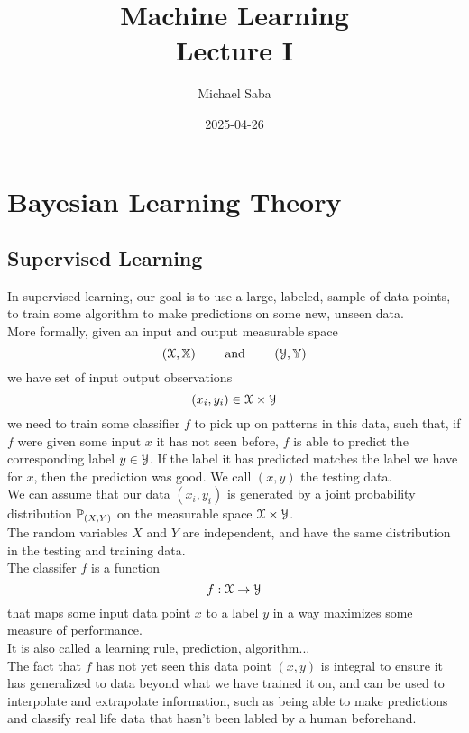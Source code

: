 \documentclass[12pt]{article}
\title{%
    \Huge Machine Learning \\
    \Large Lecture I
}
\date{2025-04-26}
\author{Michael Saba}
\begin{document}
\maketitle
\newpage
\setlength{\parindent}{0pt}

\section*{Bayesian Learning Theory}

\subsection*{Supervised Learning}

In supervised learning,
our goal is to use a large,
labeled, sample of data points,
to train some algorithm
to make predictions on some new,
unseen data. \\

More formally,
given an input and output measurable
space
\[ (\mathcal{X}, \mathbb{X}) \qquad 
\text{ and } \qquad (\mathcal{Y}, \mathbb{Y}) \]
we have set of input output 
observations
\[ (x_i, y_i) \in \mathcal{X} \times \mathcal{Y} \]
we need to train some classifier $f$
to pick up on patterns in this data,
such that, if $f$
were given some input $x$
it has not seen before,
$f$ is able to predict the corresponding
label $y \in \mathcal{Y}$.
If the label it has predicted
matches the label we have for $x$,
then the prediction was good.
We call $(x, y)$ the testing data. \\

We can assume that our data
$(x_i, y_i)$ is
generated by a joint probability
distribution $\mathbb{P}_{(X, Y)}$
on the measurable space
$\mathcal{X} \times \mathcal{Y}$. \\
The random variables $X$ and $Y$
are independent,
and have the same distribution in the
testing and training data. \\

The classifer $f$ is a function
\[ f: \mathcal{X} \to \mathcal{Y} \]
that maps some input data point $x$
to a label $y$
in a way maximizes some
measure of performance. \\
It is also called a learning rule,
prediction, algorithm... \\

The fact that $f$
has not yet seen this data point $(x, y)$
is integral to ensure it has generalized
to data beyond what we have trained it on,
and can be used to interpolate and
extrapolate information,
such as being able to make predictions
and classify real life data
that hasn't been labled by a human
beforehand. \\
\end{document}

